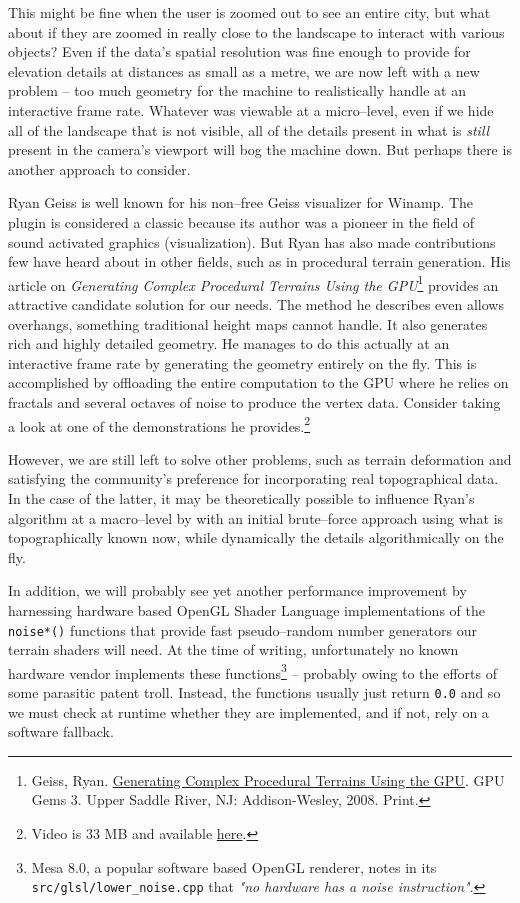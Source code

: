 This might be fine when the user is zoomed out to see an entire city, but what about if they are zoomed in really close to the landscape to interact with various objects? Even if the data's spatial resolution was fine enough to provide for elevation details at distances as small as a metre, we are now left with a new problem -- too much geometry for the machine to realistically handle at an interactive frame rate. Whatever was viewable at a micro--level, even if we hide all of the landscape that is not visible, all of the details present in what is {\it still} present in the camera's viewport will bog the machine down. But perhaps there is another approach to consider.

Ryan Geiss is well known for his non--free Geiss visualizer for Winamp. The plugin is considered a classic because its author was a pioneer in the field of sound activated graphics (visualization). But Ryan has also made contributions few have heard about in other fields, such as in procedural terrain generation. His article on {\it Generating Complex Procedural Terrains Using the GPU}\footnote{Geiss, Ryan. \href{http://http.developer.nvidia.com/GPUGems3/gpugems3_ch01.html}{Generating Complex Procedural Terrains Using the GPU}. GPU Gems 3. Upper Saddle River, NJ: Addison-Wesley, 2008. Print.} provides an attractive candidate solution for our needs. The method he describes even allows overhangs, something traditional height maps cannot handle. It also generates rich and highly detailed geometry. He manages to do this actually at an interactive frame rate by generating the geometry entirely on the fly. This is accomplished by offloading the entire computation to the GPU where he relies on fractals and several octaves of noise to produce the vertex data. Consider taking a look at one of the demonstrations he provides.\footnote{Video is 33 MB and available \href{http://www.geisswerks.com/gpugems3ch/MVI_7867.avi}{here}.}

However, we are still left to solve other problems, such as terrain deformation and satisfying the community's preference for incorporating real topographical data. In the case of the latter, it may be theoretically possible to influence Ryan's algorithm at a macro--level by  with an initial brute--force approach using what is topographically known now, while dynamically  the details algorithmically on the fly.

In addition, we will probably see yet another performance improvement by harnessing hardware based OpenGL Shader Language implementations of the {\tt noise*()} functions that provide fast pseudo--random number generators our terrain shaders will need. At the time of writing, unfortunately no known hardware vendor implements these functions\footnote{Mesa 8.0, a popular software based OpenGL renderer, notes in its {\tt src/glsl/lower_noise.cpp} that {\it "no hardware has a noise instruction"}.} -- probably owing to the efforts of some parasitic patent troll. Instead, the functions usually just return {\tt 0.0} and so we must check at runtime whether they are implemented, and if not, rely on a software fallback.


